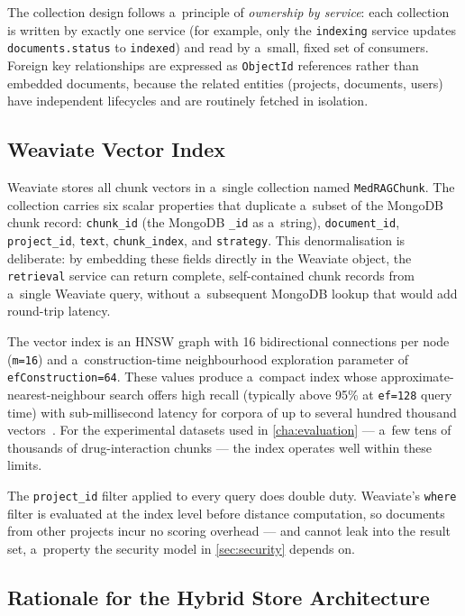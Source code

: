 The collection design follows a~principle of \emph{ownership by service}:
each collection is written by exactly one service (for example, only the
\texttt{indexing} service updates \texttt{documents.status} to
\texttt{indexed}) and read by a~small, fixed set of consumers.  Foreign
key relationships are expressed as \texttt{ObjectId} references rather
than embedded documents, because the related entities (projects, documents,
users) have independent lifecycles and are routinely fetched in isolation.

\subsection{Weaviate Vector Index}

Weaviate stores all chunk vectors in a~single collection named
\texttt{MedRAGChunk}.  The collection carries six scalar properties that
duplicate a~subset of the MongoDB chunk record: \texttt{chunk\_id} (the
MongoDB \texttt{\_id} as a~string), \texttt{document\_id},
\texttt{project\_id}, \texttt{text}, \texttt{chunk\_index}, and
\texttt{strategy}.  This denormalisation is deliberate: by embedding these
fields directly in the Weaviate object, the \texttt{retrieval} service can
return complete, self-contained chunk records from a~single Weaviate query,
without a~subsequent MongoDB lookup that would add round-trip latency.

The vector index is an HNSW graph with 16 bidirectional connections per node
(\texttt{m=16}) and a~construction-time neighbourhood exploration parameter
of \texttt{efConstruction=64}.  These values produce a~compact index whose
approximate-nearest-neighbour search offers high recall (typically above 95\%
at \texttt{ef=128} query time) with sub-millisecond latency for corpora of
up to several hundred thousand vectors~\cite{malkov2018hnsw}.  For the
experimental datasets used in \cref{cha:evaluation} --- a~few tens
of thousands of drug-interaction chunks --- the index operates well within
these limits.

The \texttt{project\_id} filter applied to every query does double duty.
Weaviate's \texttt{where} filter is evaluated at the index
level before distance computation, so documents from other
projects incur no scoring overhead --- and cannot leak into the result
set, a~property the security model in \cref{sec:security} depends on.

\subsection{Rationale for the Hybrid Store Architecture}

